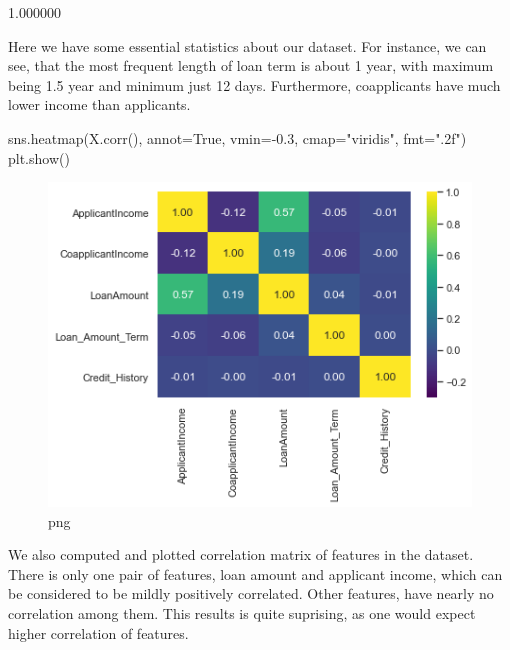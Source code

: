 \documentclass[]{article}
\newenvironment{Shaded}{}{}
\newcommand{\FloatTok}[1]{\textcolor[rgb]{0.25,0.63,0.44}{#1}}
\newcommand{\NormalTok}[1]{#1}
\newcommand{\OperatorTok}[1]{\textcolor[rgb]{0.40,0.40,0.40}{#1}}
\newcommand{\StringTok}[1]{\textcolor[rgb]{0.25,0.44,0.63}{#1}}
\newcommand{\VariableTok}[1]{\textcolor[rgb]{0.10,0.09,0.49}{#1}}
\begin{document}
1.000000

Here we have some essential statistics about our dataset. For instance,
we can see, that the most frequent length of loan term is about 1 year,
with maximum being 1.5 year and minimum just 12 days. Furthermore,
coapplicants have much lower income than applicants.

\begin{Shaded}
\begin{Highlighting}[]
\NormalTok{sns.heatmap(X.corr(), annot}\OperatorTok{=}\VariableTok{True}\NormalTok{, vmin}\OperatorTok{=-}\FloatTok{0.3}\NormalTok{, cmap}\OperatorTok{=}\StringTok{"viridis"}\NormalTok{, fmt}\OperatorTok{=}\StringTok{".2f"}\NormalTok{)}
\NormalTok{plt.show()}
\end{Highlighting}
\end{Shaded}

\begin{figure}
\centering
\includegraphics{notebook_files/notebook_18_0.png}
\caption{png}
\end{figure}

We also computed and plotted correlation matrix of features in the
dataset. There is only one pair of features, loan amount and applicant
income, which can be considered to be mildly positively correlated.
Other features, have nearly no correlation among them. This results is
quite suprising, as one would expect higher correlation of features.
\end{document}
